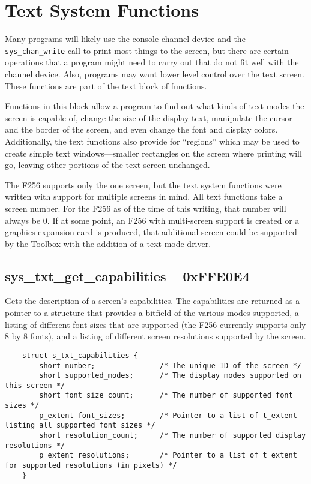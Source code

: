 \section{Text System Functions}
Many programs will likely use the console channel device and the \verb+sys_chan_write+ call to print most things to the screen,
but there are certain operations that a program might need to carry out that do not fit well with the channel device. Also,
programs may want lower level control over the text screen. These functions are part of the text block of functions.

Functions in this block allow a program to find out what kinds of text modes the screen is capable of, change the
size of the display text, manipulate the cursor and the border of the screen, and even change the font and display colors.
Additionally, the text functions also provide for ``regions'' which may be used to create simple text windows---smaller rectangles
on the screen where printing will go, leaving other portions of the text screen unchanged.

The F256 supports only the one screen, but the text system functions were written with support for multiple screens in mind.
All text functions take a screen number. For the F256 as of the time of this writing, that number will always be 0.
If at some point, an F256 with multi-screen support is created or a graphics expansion card is produced, that additional
screen could be supported by the Toolbox with the addition of a text mode driver.

\subsection*{sys\_txt\_get\_capabilities  -- 0xFFE0E4}
Gets the description of a screen's capabilities.
The capabilities are returned as a pointer to a structure that provides a bitfield of the various modes supported, a listing of different font sizes that are supported (the F256 currently supports only 8 by 8 fonts), and a listing of different screen resolutions supported by the screen.

\begin{lstlisting}
	struct s_txt_capabilities {
		short number;               /* The unique ID of the screen */
		short supported_modes;      /* The display modes supported on this screen */
		short font_size_count;      /* The number of supported font sizes */
		p_extent font_sizes;        /* Pointer to a list of t_extent listing all supported font sizes */
		short resolution_count;     /* The number of supported display resolutions */
		p_extent resolutions;       /* Pointer to a list of t_extent for supported resolutions (in pixels) */
	}
\end{lstlisting}

